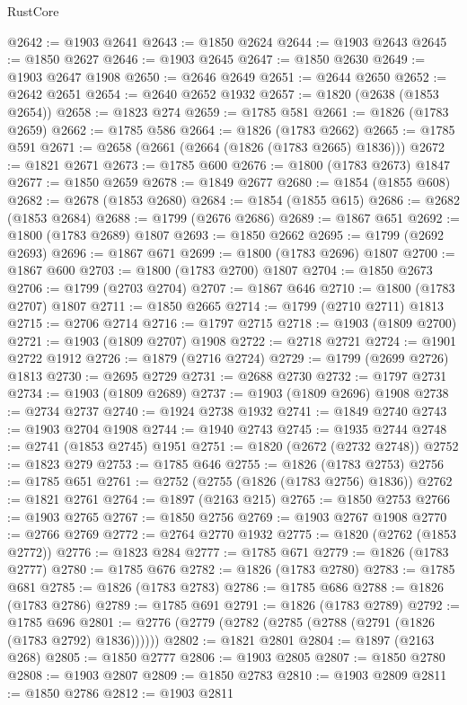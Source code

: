 \begin{lexlean}{RustCore}
\begin{coremodule}
@2642 := @1903 @2641
@2643 := @1850 @2624
@2644 := @1903 @2643
@2645 := @1850 @2627
@2646 := @1903 @2645
@2647 := @1850 @2630
@2649 := @1903 @2647 @1908
@2650 := @2646 @2649
@2651 := @2644 @2650
@2652 := @2642 @2651
@2654 := @2640 @2652 @1932
@2657 := @1820 (@2638 (@1853 @2654))
@2658 := @1823 @274
@2659 := @1785 @581
@2661 := @1826 (@1783 @2659)
@2662 := @1785 @586
@2664 := @1826 (@1783 @2662)
@2665 := @1785 @591
@2671 := @2658 (@2661 (@2664 (@1826 (@1783 @2665) @1836)))
@2672 := @1821 @2671
@2673 := @1785 @600
@2676 := @1800 (@1783 @2673) @1847
@2677 := @1850 @2659
@2678 := @1849 @2677
@2680 := @1854 (@1855 @608)
@2682 := @2678 (@1853 @2680)
@2684 := @1854 (@1855 @615)
@2686 := @2682 (@1853 @2684)
@2688 := @1799 (@2676 @2686)
@2689 := @1867 @651
@2692 := @1800 (@1783 @2689) @1807
@2693 := @1850 @2662
@2695 := @1799 (@2692 @2693)
@2696 := @1867 @671
@2699 := @1800 (@1783 @2696) @1807
@2700 := @1867 @600
@2703 := @1800 (@1783 @2700) @1807
@2704 := @1850 @2673
@2706 := @1799 (@2703 @2704)
@2707 := @1867 @646
@2710 := @1800 (@1783 @2707) @1807
@2711 := @1850 @2665
@2714 := @1799 (@2710 @2711) @1813
@2715 := @2706 @2714
@2716 := @1797 @2715
@2718 := @1903 (@1809 @2700)
@2721 := @1903 (@1809 @2707) @1908
@2722 := @2718 @2721
@2724 := @1901 @2722 @1912
@2726 := @1879 (@2716 @2724)
@2729 := @1799 (@2699 @2726) @1813
@2730 := @2695 @2729
@2731 := @2688 @2730
@2732 := @1797 @2731
@2734 := @1903 (@1809 @2689)
@2737 := @1903 (@1809 @2696) @1908
@2738 := @2734 @2737
@2740 := @1924 @2738 @1932
@2741 := @1849 @2740
@2743 := @1903 @2704 @1908
@2744 := @1940 @2743
@2745 := @1935 @2744
@2748 := @2741 (@1853 @2745) @1951
@2751 := @1820 (@2672 (@2732 @2748))
@2752 := @1823 @279
@2753 := @1785 @646
@2755 := @1826 (@1783 @2753)
@2756 := @1785 @651
@2761 := @2752 (@2755 (@1826 (@1783 @2756) @1836))
@2762 := @1821 @2761
@2764 := @1897 (@2163 @215)
@2765 := @1850 @2753
@2766 := @1903 @2765
@2767 := @1850 @2756
@2769 := @1903 @2767 @1908
@2770 := @2766 @2769
@2772 := @2764 @2770 @1932
@2775 := @1820 (@2762 (@1853 @2772))
@2776 := @1823 @284
@2777 := @1785 @671
@2779 := @1826 (@1783 @2777)
@2780 := @1785 @676
@2782 := @1826 (@1783 @2780)
@2783 := @1785 @681
@2785 := @1826 (@1783 @2783)
@2786 := @1785 @686
@2788 := @1826 (@1783 @2786)
@2789 := @1785 @691
@2791 := @1826 (@1783 @2789)
@2792 := @1785 @696
@2801 := @2776 (@2779 (@2782 (@2785 (@2788 (@2791 (@1826 (@1783 @2792) @1836))))))
@2802 := @1821 @2801
@2804 := @1897 (@2163 @268)
@2805 := @1850 @2777
@2806 := @1903 @2805
@2807 := @1850 @2780
@2808 := @1903 @2807
@2809 := @1850 @2783
@2810 := @1903 @2809
@2811 := @1850 @2786
@2812 := @1903 @2811

\end{coremodule}
\end{lexlean}
